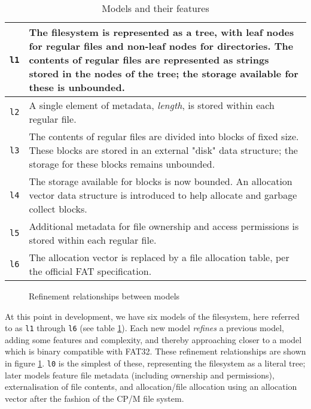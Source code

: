 \documentclass[runningheads,a4paper]{llncs}
\begin{document}
\begin{table}[]
  \centering
  \caption{Models and their features}
  \label{model-description-table}
  \begin{tabular}{|l|p{120mm}|}
    \hline
    \texttt{l1} & The filesystem is represented as a tree, with leaf
    nodes for regular files and non-leaf nodes for
    directories. The contents of regular files are represented as
    strings stored in the nodes of the tree; the storage available for
    these is unbounded. \\ \hline
    \texttt{l2} & A single element of metadata, \textit{length}, is
    stored within each regular file.  \\ \hline
    \texttt{l3} & The contents of regular files are divided into
    blocks of fixed size. These blocks are stored in an external
    "disk" data structure; the storage for these blocks remains
    unbounded. \\ \hline
    \texttt{l4} & The storage available for blocks is now bounded. An
    allocation vector data structure is introduced to help allocate
    and garbage collect blocks. \\ \hline
    \texttt{l5} & Additional metadata for file ownership and access
    permissions is stored within each regular file. \\ \hline
    \texttt{l6} & The allocation vector is replaced by a file
    allocation table, per the official FAT specification. \\ \hline
  \end{tabular}
\end{table}

\begin{figure}
  \centering
  \caption{Refinement relationships between models}
  \label{refinement-figure}
\end{figure}

At this point in development, we have six models of the filesystem,
here referred to as \texttt{l1} through \texttt{l6} (see
table \ref{model-description-table}). Each new model
\textit{refines} a previous model, adding some features and
complexity, and thereby approaching closer to a model which is binary
compatible with FAT32. These refinement relationships are shown in
figure \ref{refinement-figure}. \texttt{l0} is the simplest of these,
representing the filesystem as a literal tree; later models feature
file metadata (including ownership and permissions), externalisation
of file contents, and allocation/file allocation using an allocation
vector after the fashion of the CP/M file system.
\end{document}
